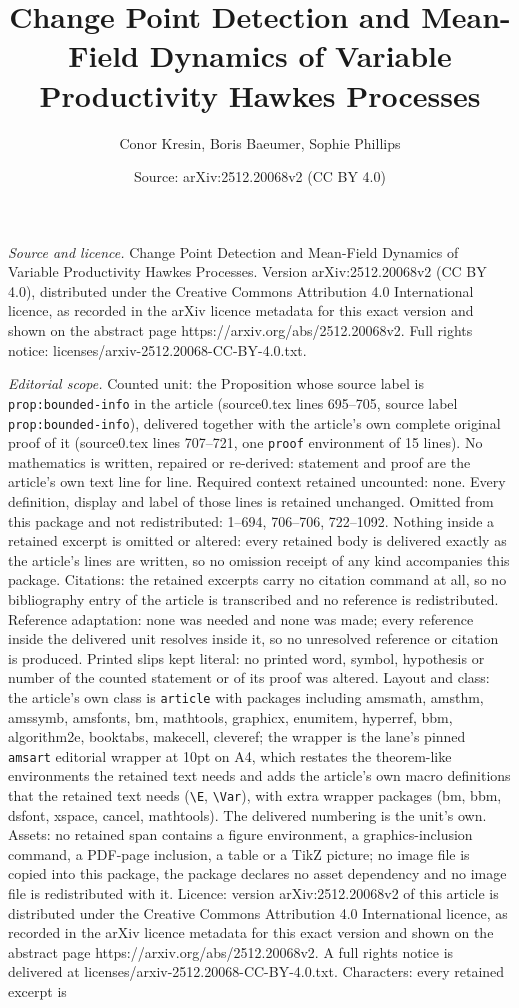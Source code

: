 \documentclass[10pt,a4paper]{amsart}
\title[Change Point Detection and Mean-Field Dynamics of Variable P]{Change Point Detection and Mean-Field Dynamics of Variable Productivity Hawkes Processes}
\author{Conor Kresin, Boris Baeumer, Sophie Phillips}
\date{Source: arXiv:2512.20068v2 (CC BY 4.0)}
\begin{document}
\maketitle

\noindent\emph{Source and licence.} Change Point Detection and Mean-Field Dynamics of Variable Productivity Hawkes Processes. Version arXiv:2512.20068v2 (CC BY 4.0), distributed under the Creative Commons Attribution 4.0 International licence, as recorded in the arXiv licence metadata for this exact version and shown on the abstract page https://arxiv.org/abs/2512.20068v2. Full rights notice: licenses/arxiv-2512.20068-CC-BY-4.0.txt.\par\smallskip

\noindent\textit{Editorial scope.} Counted unit: the Proposition whose source label is \texttt{prop:bounded-info} in the article (source0.tex lines 695--705, source label \texttt{prop:bounded-info}), delivered together with the article's own complete original proof of it (source0.tex lines 707--721, one \texttt{proof} environment of 15 lines). No mathematics is written, repaired or re-derived: statement and proof are the article's own text line for line. Required context retained uncounted: none. Every definition, display and label of those lines is retained unchanged. Omitted from this package and not redistributed: 1--694, 706--706, 722--1092. Nothing inside a retained excerpt is omitted or altered: every retained body is delivered exactly as the article's lines are written, so no omission receipt of any kind accompanies this package. Citations: the retained excerpts carry no citation command at all, so no bibliography entry of the article is transcribed and no reference is redistributed. Reference adaptation: none was needed and none was made; every reference inside the delivered unit resolves inside it, so no unresolved reference or citation is produced. Printed slips kept literal: no printed word, symbol, hypothesis or number of the counted statement or of its proof was altered. Layout and class: the article's own class is \texttt{article} with packages including amsmath, amsthm, amssymb, amsfonts, bm, mathtools, graphicx, enumitem, hyperref, bbm, algorithm2e, booktabs, makecell, cleveref; the wrapper is the lane's pinned \texttt{amsart} editorial wrapper at 10pt on A4, which restates the theorem-like environments the retained text needs and adds the article's own macro definitions that the retained text needs (\texttt{\textbackslash E}, \texttt{\textbackslash Var}), with extra wrapper packages (bm, bbm, dsfont, xspace, cancel, mathtools). The delivered numbering is the unit's own. Assets: no retained span contains a figure environment, a graphics-inclusion command, a PDF-page inclusion, a table or a TikZ picture; no image file is copied into this package, the package declares no asset dependency and no image file is redistributed with it. Licence: version arXiv:2512.20068v2 of this article is distributed under the Creative Commons Attribution 4.0 International licence, as recorded in the arXiv licence metadata for this exact version and shown on the abstract page https://arxiv.org/abs/2512.20068v2. A full rights notice is delivered at licenses/arxiv-2512.20068-CC-BY-4.0.txt. Characters: every retained excerpt is 
\end{document}
